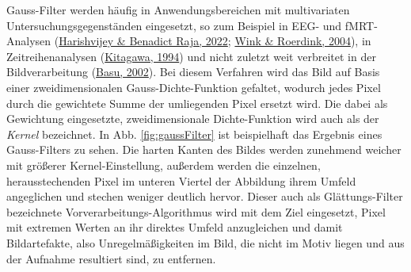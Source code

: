 \documentclass[
  12pt,
  openany]{book}
\begin{document}
Gauss-Filter werden häufig in Anwendungsbereichen mit multivariaten Untersuchungsgegenständen eingesetzt, so zum Beispiel in EEG- und fMRT-Analysen (\protect\hyperlink{ref-harishvijeyAutomatedTechniqueEEG2022}{Harishvijey \& Benadict Raja, 2022}; \protect\hyperlink{ref-winkDenoisingFunctionalMR2004}{Wink \& Roerdink, 2004}), in Zeitreihenanalysen (\protect\hyperlink{ref-kitagawaTwofilterFormulaSmoothing1994}{Kitagawa, 1994}) und nicht zuletzt weit verbreitet in der Bildverarbeitung (\protect\hyperlink{ref-basuGaussianbasedEdgedetectionMethodsa2002}{Basu, 2002}).\newline
Bei diesem Verfahren wird das Bild auf Basis einer zweidimensionalen Gauss-Dichte-Funktion gefaltet, wodurch jedes Pixel durch die gewichtete Summe der umliegenden Pixel ersetzt wird. Die dabei als Gewichtung eingesetzte, zweidimensionale Dichte-Funktion wird auch als der \emph{Kernel} bezeichnet. In Abb. \ref{fig:gaussFilter} ist beispielhaft das Ergebnis eines Gauss-Filters zu sehen. Die harten Kanten des Bildes werden zunehmend weicher mit größerer Kernel-Einstellung, außerdem werden die einzelnen, herausstechenden Pixel im unteren Viertel der Abbildung ihrem Umfeld angeglichen und stechen weniger deutlich hervor.
Dieser auch als Glättungs-Filter bezeichnete Vorverarbeitungs-Algorithmus wird mit dem Ziel eingesetzt, Pixel mit extremen Werten an ihr direktes Umfeld anzugleichen und damit Bildartefakte, also Unregelmäßigkeiten im Bild, die nicht im Motiv liegen und aus der Aufnahme resultiert sind, zu entfernen.
\end{document}
